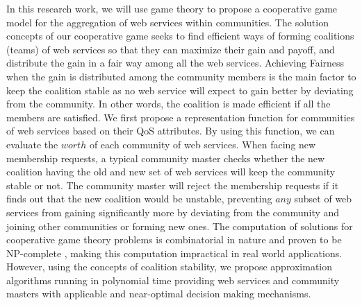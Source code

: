         In this research work, we will use game theory to
        propose a cooperative game model for the aggregation of web
        services within communities. The solution concepts of our
        cooperative game seeks to find efficient ways of forming
        coalitions (teams) of web services so that they can maximize their
        gain and payoff, and distribute the gain in a fair way among all
        the web services. Achieving Fairness when the gain is distributed
        among the community members is the main factor to keep the
        coalition stable as no web service will expect to gain better by
        deviating from the community. In other words, the coalition is made
        efficient if all the members are satisfied. We first propose a
        representation function for communities of web services based on
        their QoS attributes. By using this function, we can evaluate the
        $worth$ of each community of web services. When facing new
        membership requests, a typical community master checks whether the
        new coalition having the old and new set of web services will keep
        the community stable or not. The community master will reject the
        membership requests if it finds out that the new coalition would
        be unstable, preventing $any$ subset of web services from gaining
        significantly more by deviating from the community and joining
        other communities or forming new ones. The computation of
        solutions for cooperative game theory problems is combinatorial in
        nature and proven to be NP-complete \cite{Algorithmic}, making
        this computation impractical in real world applications. However,
        using the concepts of coalition stability, we propose
        approximation algorithms running in polynomial time providing web
        services and community masters with applicable and near-optimal
        decision making mechanisms.




